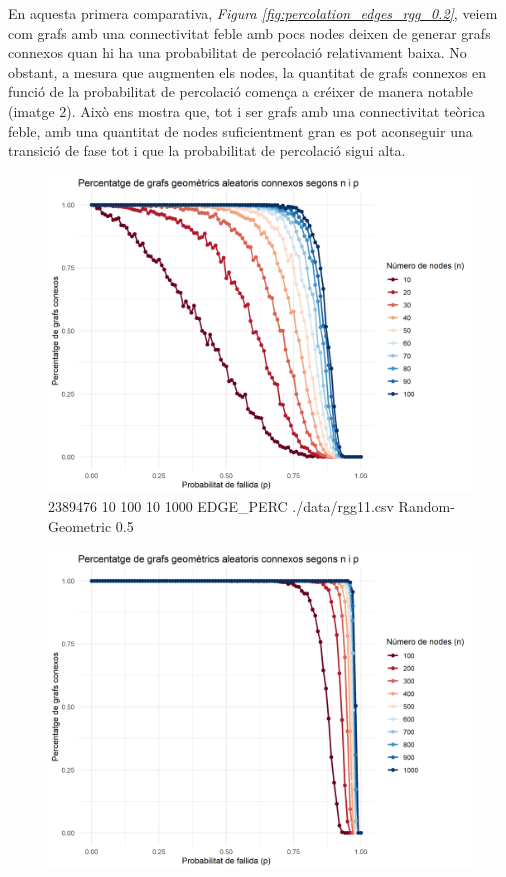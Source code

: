\documentclass[a4paper]{article}
\begin{document}
	En aquesta primera comparativa, \textit{Figura \ref{fig:percolation_edges_rgg_0.2}}, veiem com grafs amb una connectivitat feble amb pocs nodes deixen de generar grafs connexos quan hi ha una probabilitat de percolació relativament baixa. No obstant, a mesura que augmenten els nodes, la quantitat de grafs connexos en funció de la probabilitat de percolació comença a créixer de manera notable (imatge 2). Això ens mostra que, tot i ser grafs amb una connectivitat teòrica feble, amb una quantitat de nodes suficientment gran es pot aconseguir una transició de fase tot i que la probabilitat de percolació sigui alta. \\
	
	\begin{figure}[H]
		\centering
		\begin{minipage}{0.45\textwidth}
			\centering
			\includegraphics[width=\textwidth]{images/randomGeometric_10-100_0.5}
			\footnotesize{2389476 10 100 10 1000 EDGE\_PERC ./data/rgg11.csv Random-Geometric 0.5}
		\end{minipage}
		\hfill
		\begin{minipage}{0.45\textwidth}
			\centering
			\includegraphics[width=\textwidth]{images/randomGeometric_100-1000_0.5}

\end{minipage}
\end{figure}
\end{document}

